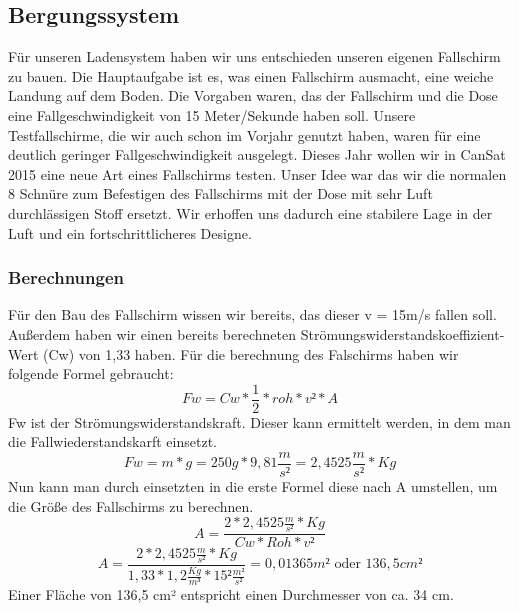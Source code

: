\subsection{Bergungssystem}
Für unseren Ladensystem haben wir uns entschieden unseren eigenen Fallschirm zu bauen. Die Hauptaufgabe ist es, was einen Fallschirm ausmacht, eine weiche Landung auf dem Boden. Die Vorgaben waren, das der Fallschirm und die Dose eine Fallgeschwindigkeit von 15 Meter/Sekunde haben soll. Unsere Testfallschirme, die wir auch schon im Vorjahr genutzt haben, waren für eine deutlich geringer Fallgeschwindigkeit ausgelegt. Dieses Jahr wollen wir in CanSat 2015 eine neue Art eines Fallschirms testen. Unser Idee war das wir die normalen 8 Schnüre zum Befestigen des Fallschirms mit der Dose mit sehr Luft durchlässigen Stoff ersetzt. Wir erhoffen uns dadurch eine stabilere Lage in der Luft und ein fortschrittlicheres Designe.

\subsubsection{Berechnungen}
Für den Bau des Fallschirm wissen wir bereits, das dieser v = 15m/s fallen soll. Außerdem haben wir einen bereits berechneten Strömungswiderstandskoeffizient-Wert (Cw) von 1,33 haben. Für die berechnung des Falschirms haben wir folgende Formel gebraucht:
\[
Fw = Cw*\frac{1}{2}*roh*v²*A
\]
Fw ist der Strömungswiderstandskraft. Dieser kann ermittelt werden, in dem man die Fallwiederstandskarft einsetzt.
\[
Fw = m * g = 250g * 9,81\frac{m}{s²} = 2,4525\frac{m}{s²}*Kg
\]
Nun kann man durch einsetzten in die erste Formel diese nach A umstellen, um die Größe des Fallschirms zu berechnen.
\[
A=\frac{2*2,4525\frac{m}{s²}*Kg}{Cw*Roh*v²}
\]
\[
A=\frac{2*2,4525\frac{m}{s²}*Kg}{1,33*1,2\frac{Kg}{m³}*15²\frac{m²}{s²}} = 0,01365m² \text{ oder } 136,5cm²
\]
Einer Fläche von 136,5 cm² entspricht einen Durchmesser von ca. 34 cm.

